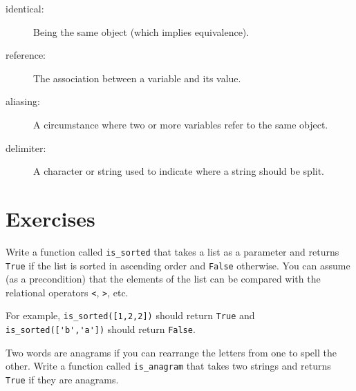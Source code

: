 \documentclass[10pt]{book}
\begin{document}
\begin{description}
\item[identical:] Being the same object (which implies equivalence).

\item[reference:] The association between a variable and its value.

\item[aliasing:] A circumstance where two or more variables refer to the same
object.

\item[delimiter:] A character or string used to indicate where a
string should be split.

\end{description}


\section{Exercises}

\begin{exercise}
Write a function called \verb"is_sorted" that takes a list as a
parameter and returns {\tt True} if the list is sorted in ascending
order and {\tt False} otherwise.  You can assume (as a precondition)
that the elements of the list can be compared with the relational
operators {\tt <}, {\tt >}, etc.

For example, \verb"is_sorted([1,2,2])" should return {\tt True}
and \verb"is_sorted(['b','a'])" should return {\tt False}.
\end{exercise}


\begin{exercise}
\label{anagram}

Two words are anagrams if you can rearrange the letters from one
to spell the other.  Write a function called \verb"is_anagram"
that takes two strings and returns {\tt True} if they are anagrams.
\end{exercise}
\end{document}
